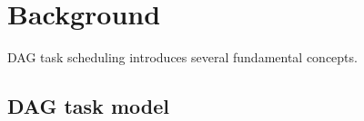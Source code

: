 
\section{Background}
\label{sec:bg}

DAG task scheduling introduces several fundamental concepts.

%
%

\subsection{DAG task model}
~

